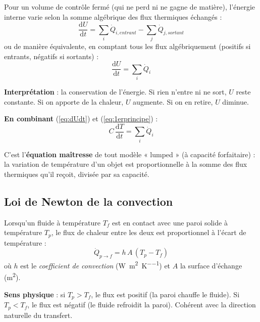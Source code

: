 \documentclass[11pt,a4paper]{article}
\begin{document}
\begin{principe}
Pour un volume de contrôle fermé (qui ne perd ni ne gagne de matière), l'énergie interne
varie selon la somme algébrique des flux thermiques échangés :
\begin{equation}
\frac{\mathrm{d}U}{\mathrm{d}t} = \sum_i \dot Q_{i,entrant} - \sum_j \dot Q_{j,sortant}
\end{equation}
ou de manière équivalente, en comptant tous les flux algébriquement (positifs si entrants,
négatifs si sortants) :
\begin{equation}
\frac{\mathrm{d}U}{\mathrm{d}t} = \sum_i \dot Q_i
\label{eq:1erprincipe}
\end{equation}
\end{principe}

\textbf{Interprétation} : la conservation de l'énergie. Si rien n'entre ni ne sort, $U$
reste constante. Si on apporte de la chaleur, $U$ augmente. Si on en retire, $U$ diminue.

\textbf{En combinant} (\ref{eq:dUdt}) et (\ref{eq:1erprincipe}) :
\begin{equation}
\boxed{\;C\,\frac{\mathrm{d}T}{\mathrm{d}t} = \sum_i \dot Q_i\;}
\label{eq:bilanlumped}
\end{equation}

C'est l'\textbf{équation maîtresse} de tout modèle « lumped » (à capacité forfaitaire) :
la variation de température d'un objet est proportionnelle à la somme des flux thermiques
qu'il reçoit, divisée par sa capacité.

\subsection{Loi de Newton de la convection}

\begin{principe}
Lorsqu'un fluide à température $T_f$ est en contact avec une paroi solide à température
$T_p$, le flux de chaleur entre les deux est proportionnel à l'écart de température :
\begin{equation}
\dot Q_{p\to f} = h\,A\,(T_p - T_f)
\end{equation}
où $h$ est le \emph{coefficient de convection} (\si{\watt\per\meter\squared\per\kelvin}) et
$A$ la surface d'échange (\si{\meter\squared}).
\end{principe}

\textbf{Sens physique} : si $T_p > T_f$, le flux est positif (la paroi chauffe le fluide).
Si $T_p < T_f$, le flux est négatif (le fluide refroidit la paroi). Cohérent avec la
direction naturelle du transfert.
\end{document}

